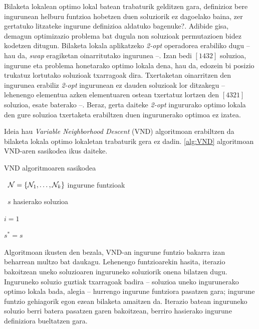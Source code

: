 \documentclass[eu]{ifirak}\usepackage[]{graphicx}\usepackage[]{color}
\begin{document}
Bilaketa lokalean optimo lokal batean trabaturik gelditzen gara, definizioz bere ingurunean helburu funtzioa hobetzen duen soluziorik ez dagoelako baina, zer gertatuko litzateke ingurune definizioa aldatuko bagenuke?. Adibide gisa, demagun optimizazio problema bat dugula non soluzioak permutazioen bidez kodetzen ditugun. Bilaketa lokala aplikatzeko \textit{2-opt} operadorea erabiliko dugu -- hau da, \textit{swap} eragiketan oinarritutako ingurunea --. Izan bedi $[1432]$ soluzioa, ingurune eta problema honetarako optimo lokala dena, hau da, edozein bi posizio trukatuz lortutako soluzioak txarragoak dira. Txertaketan oinarritzen den ingurunea erabiliz \textit{2-opt} ingurunean ez dauden soluzioak lor ditzakegu -- lehenengo elementua azken elementuaren ostean txertatuz lortzen den $[4321]$ soluzioa, esate baterako --. Beraz, gerta daiteke \textit{2-opt} ingururako optimo lokala den gure soluzioa txertaketa erabiltzen duen ingurunerako optimoa ez izatea.

Ideia hau \textit{Variable Neighborhood Descent} (VND) algoritmoan erabiltzen da bilaketa lokala optimo lokaletan trabaturik gera ez dadin. \ref{alg:VND} algoritmoan VND-aren sasikodea ikus daiteke. 

\begin{ifalgorithm}[t]
\begin{ifpseudo}{VND algoritmoaren sasikodea}
\item \In\ $\mathbf{\cal N} = \{{\cal N}_1,\ldots,{\cal N}_k\}$ ingurune funtzioak
\item \In\ $s$ hasierako soluzioa
\item  $i=1$
\item  $s^* = s$
\item {} \Do
\item {}
\item {}
\item {}
\item {}
\item \T{\Else}
\item {}
\item \T{\EIf}
\item \Done
\end{ifpseudo}
\caption{VND algoritmoaren sasikodea}\label{alg:VND}
\end{ifalgorithm}

Algoritmoan ikusten den bezala, VND-an ingurune funtzio bakarra izan beharrean multzo bat daukagu. Lehenengo funtzioarekin hasita, iterazio bakoitzean uneko soluzioaren inguruneko soluziorik onena bilatzen dugu. Inguruneko soluzio guztiak txarragoak badira -- soluzioa uneko ingurunerako optimo lokala bada, alegia -- hurrengo ingurune funtziora pasatzen gara; ingurune funtzio gehiagorik egon ezean bilaketa amaitzen da. Iterazio batean inguruneko soluzio berri batera pasatzen garen bakoitzean, berriro hasierako ingurune definiziora bueltatzen gara.
\end{document}
